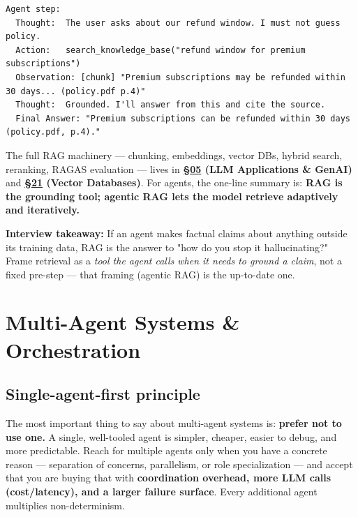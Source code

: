 \documentclass[11pt]{article}
\begin{document}
\setcodelang{}

\begin{verbatim}
Agent step:
  Thought:  The user asks about our refund window. I must not guess policy.
  Action:   search_knowledge_base("refund window for premium subscriptions")
  Observation: [chunk] "Premium subscriptions may be refunded within 30 days... (policy.pdf p.4)"
  Thought:  Grounded. I'll answer from this and cite the source.
  Final Answer: "Premium subscriptions can be refunded within 30 days (policy.pdf, p.4)."
\end{verbatim}

The full RAG machinery --- chunking, embeddings, vector DBs, hybrid search, reranking, RAGAS evaluation --- lives in \textbf{\hyperlink{section.05}{\textcolor{acc}{§05}} (LLM Applications \& GenAI)} and \textbf{\hyperlink{section.21}{\textcolor{acc}{§21}} (Vector Databases)}. For agents, the one-line summary is: \textbf{RAG is the grounding tool; agentic RAG lets the model retrieve adaptively and iteratively.}

\textbf{Interview takeaway:} If an agent makes factual claims about anything outside its training data, RAG is the answer to "how do you stop it hallucinating?" Frame retrieval as a \emph{tool the agent calls when it needs to ground a claim}, not a fixed pre-step --- that framing (agentic RAG) is the up-to-date one.

\section{Multi-Agent Systems \& Orchestration}\label{multi-agent-systems--orchestration}

\subsection{Single-agent-first principle}\label{single-agent-first-principle}

The most important thing to say about multi-agent systems is: \textbf{prefer not to use one.} A single, well-tooled agent is simpler, cheaper, easier to debug, and more predictable. Reach for multiple agents only when you have a concrete reason --- separation of concerns, parallelism, or role specialization --- and accept that you are buying that with \textbf{coordination overhead, more LLM calls (cost/latency), and a larger failure surface}. Every additional agent multiplies non-determinism.

\setcodelang{}
\end{document}

